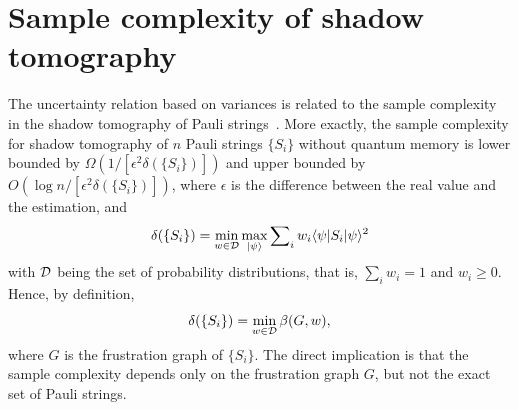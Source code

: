 \documentclass[
12pt,
prx,
aps,
reprint,
a4paper,
longbibliograph,
nofootinbib,
nobibnotes,
superscriptaddress
]{revtex4-2}
\theoremstyle{definition}
\begin{document}
\section{Sample complexity of shadow tomography}\label{sec:shadow}
The uncertainty relation based on variances is related to the sample complexity in the shadow tomography of Pauli strings~\cite{king2024triplyefficientshadowtomography,chen2024Optimal}. More exactly,
the sample complexity for shadow tomography of $n$ Pauli strings $\{S_i\}$ without quantum memory is lower bounded by $\Omega(1/[\epsilon^2 \delta(\{S_i\})])$ and upper bounded by $O(\log n/[\epsilon^2 \delta(\{S_i\})])$, where $\epsilon$ is the difference between the real value and the estimation, and
\begin{equation}
	\delta(\{S_i\}) = \min_{w\in {\cal D}} \max_{|\psi\rangle} \sum\nolimits_i w_i \langle \psi|S_i|\psi\rangle^2
\end{equation}
with ${\cal D}$ being the set of probability distributions, that is, $\sum_i w_i = 1$ and $w_i\ge 0$.
Hence, by definition,
\begin{equation}\label{eq:delta}
	\delta(\{S_i\}) = \min_{w\in {\cal D}} \beta(G,w),
\end{equation}
where $G$ is the frustration graph of $\{S_i\}$.
The direct implication is that the sample complexity depends only on the frustration graph $G$, but not the exact set of Pauli strings.
\end{document}
